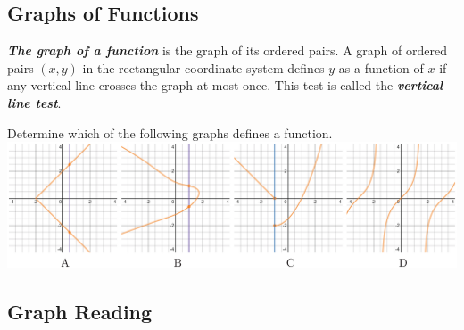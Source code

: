\hypertarget{graphs-of-functions}{%
\subsection{Graphs of Functions}\label{graphs-of-functions}}

\textbf{\emph{The graph of a function}} is the graph of its ordered
pairs. A graph of ordered pairs \((x,y)\) in the rectangular coordinate
system defines \(y\) as a function of \(x\) if any vertical line crosses
the graph at most once. This test is called the \textbf{\emph{vertical
line test}}.

\begin{example}

Determine which of the following graphs defines a function.\\
\includegraphics[width=\textwidth]{figs/four-graphs.png}
\end{example}
\vspace*{\baselineskip}


\hypertarget{graph-reading}{%
\subsection{Graph Reading}\label{graph-reading}}


